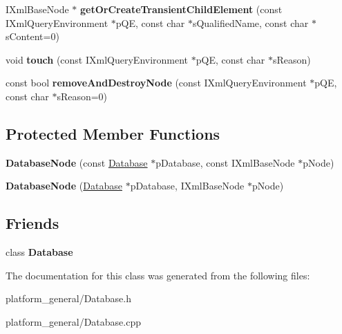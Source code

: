 \begin{DoxyCompactItemize}
\item 
\hypertarget{classgeneral__server_1_1DatabaseNode_a68f6b248ad93557040f4846777a48b60}{\-I\-Xml\-Base\-Node $\ast$ {\bfseries get\-Or\-Create\-Transient\-Child\-Element} (const \-I\-Xml\-Query\-Environment $\ast$p\-Q\-E, const char $\ast$s\-Qualified\-Name, const char $\ast$s\-Content=0)}\label{classgeneral__server_1_1DatabaseNode_a68f6b248ad93557040f4846777a48b60}

\item 
\hypertarget{classgeneral__server_1_1DatabaseNode_a0cf92fb7c412fedbbdd9b3d8e343b889}{void {\bfseries touch} (const \-I\-Xml\-Query\-Environment $\ast$p\-Q\-E, const char $\ast$s\-Reason)}\label{classgeneral__server_1_1DatabaseNode_a0cf92fb7c412fedbbdd9b3d8e343b889}

\item 
\hypertarget{classgeneral__server_1_1DatabaseNode_a46317f48e803b899c7b55cd1c0193ce4}{const bool {\bfseries remove\-And\-Destroy\-Node} (const \-I\-Xml\-Query\-Environment $\ast$p\-Q\-E, const char $\ast$s\-Reason=0)}\label{classgeneral__server_1_1DatabaseNode_a46317f48e803b899c7b55cd1c0193ce4}

\end{DoxyCompactItemize}
\subsection*{\-Protected \-Member \-Functions}
\begin{DoxyCompactItemize}
\item 
\hypertarget{classgeneral__server_1_1DatabaseNode_a63cdcedd8d1b4ca7501ce2ef5669e036}{{\bfseries \-Database\-Node} (const \hyperlink{classgeneral__server_1_1Database}{\-Database} $\ast$p\-Database, const \-I\-Xml\-Base\-Node $\ast$p\-Node)}\label{classgeneral__server_1_1DatabaseNode_a63cdcedd8d1b4ca7501ce2ef5669e036}

\item 
\hypertarget{classgeneral__server_1_1DatabaseNode_acd8b123fd48460e636ea52668ea3f1dd}{{\bfseries \-Database\-Node} (\hyperlink{classgeneral__server_1_1Database}{\-Database} $\ast$p\-Database, \-I\-Xml\-Base\-Node $\ast$p\-Node)}\label{classgeneral__server_1_1DatabaseNode_acd8b123fd48460e636ea52668ea3f1dd}

\end{DoxyCompactItemize}
\subsection*{\-Friends}
\begin{DoxyCompactItemize}
\item 
\hypertarget{classgeneral__server_1_1DatabaseNode_a6efef52d7a939622bbc934ff6b90ffe0}{class {\bfseries \-Database}}\label{classgeneral__server_1_1DatabaseNode_a6efef52d7a939622bbc934ff6b90ffe0}

\end{DoxyCompactItemize}


\-The documentation for this class was generated from the following files\-:\begin{DoxyCompactItemize}
\item 
platform\-\_\-general/\-Database.\-h\item 
platform\-\_\-general/\-Database.\-cpp\end{DoxyCompactItemize}
